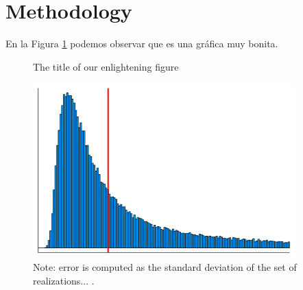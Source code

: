 \section{Methodology}
\label{section:methodology}


En la Figura \ref{figure:awesome_figure} podemos observar que es una gráfica muy bonita.

\lipsum[3]


\begin{figure}[htb]
  \caption{The title of our enlightening figure}
  \label{figure:awesome_figure}
  \centering 
  \includegraphics[width=0.9\textwidth]{figures/mse_distribution.png}
  \caption*{\footnotesize Note: error is computed as the standard deviation of the set of realizations... .}
\end{figure}